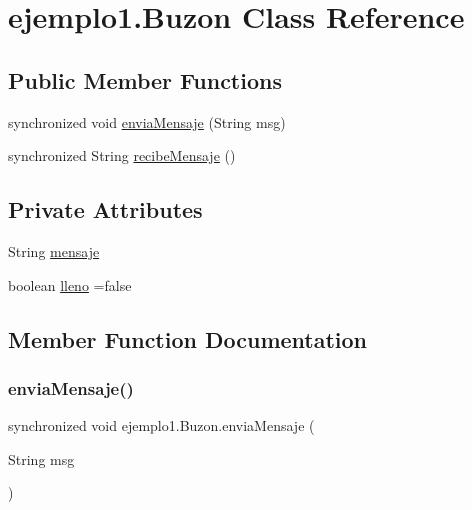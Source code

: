 \hypertarget{classejemplo1_1_1_buzon}{}\section{ejemplo1.\+Buzon Class Reference}
\label{classejemplo1_1_1_buzon}
\subsection*{Public Member Functions}
\begin{DoxyCompactItemize}
\item 
synchronized void \mbox{\hyperlink{classejemplo1_1_1_buzon_a0d9762b5773778ad0c357001bfd17393}{envia\+Mensaje}} (String msg)
\item 
synchronized String \mbox{\hyperlink{classejemplo1_1_1_buzon_a198396f4151d8359e98a2aa7e66729af}{recibe\+Mensaje}} ()
\end{DoxyCompactItemize}
\subsection*{Private Attributes}
\begin{DoxyCompactItemize}
\item 
String \mbox{\hyperlink{classejemplo1_1_1_buzon_a905e959ffa27d5f6abc134be86dbb6d3}{mensaje}}
\item 
boolean \mbox{\hyperlink{classejemplo1_1_1_buzon_ac583b5512506d514f8443245c5edb3f9}{lleno}} =false
\end{DoxyCompactItemize}


\subsection{Member Function Documentation}
\mbox{\label{classejemplo1_1_1_buzon_a0d9762b5773778ad0c357001bfd17393}} 
\subsubsection{\texorpdfstring{envia\+Mensaje()}{enviaMensaje()}}
{\footnotesize\ttfamily synchronized void ejemplo1.\+Buzon.\+envia\+Mensaje (\begin{DoxyParamCaption}\item[{String}]{msg }\end{DoxyParamCaption})\hspace{0.3cm}{\ttfamily [inline]}}


